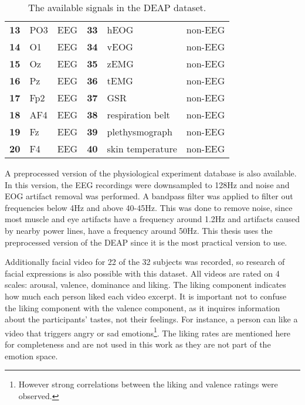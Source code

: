 \begin{table}[H]
\begin{tabular}{l|ll|l|ll}
\textbf{13}      & PO3           & EEG               & \textbf{33}      & hEOG             & non-EEG           \\
\textbf{14}      & O1            & EEG               & \textbf{34}      & vEOG             & non-EEG           \\
\textbf{15}      & Oz            & EEG               & \textbf{35}      & zEMG             & non-EEG           \\
\textbf{16}      & Pz            & EEG               & \textbf{36}      & tEMG             & non-EEG           \\
\textbf{17}      & Fp2           & EEG               & \textbf{37}      & GSR              & non-EEG           \\
\textbf{18}      & AF4           & EEG               & \textbf{38}      & respiration belt & non-EEG           \\
\textbf{19}      & Fz            & EEG               & \textbf{39}      & plethysmograph   & non-EEG           \\
\textbf{20}      & F4            & EEG               & \textbf{40}      & skin temperature & non-EEG          
\end{tabular}
\caption{The available signals in the DEAP dataset\label{DEAPSignals}.}
\end{table}

\npar

A preprocessed version of the physiological experiment database is also available. In this version, the EEG recordings were downsampled to 128Hz and noise and EOG artifact removal was performed. A bandpass filter was applied to filter out frequencies below 4Hz and above 40-45Hz. This was done to remove noise, since most muscle and eye artifacts have a frequency around 1.2Hz and artifacts caused by nearby power lines, have a frequency around 50Hz\cite{ExtendedPaper}. This thesis uses the preprocessed version of the DEAP since it is the most practical version to use.

\npar

Additionally facial video for 22 of the 32 subjects was recorded, so research of facial expressions is also possible with this dataset. All videos are rated on 4 scales: arousal, valence, dominance and liking. The liking component indicates how much each person liked each video excerpt. It is important not to confuse the liking component with the valence component, as it inquires information about the participants' tastes, not their feelings. For instance, a person can like a video that triggers angry or sad emotions\footnote{However strong correlations between the liking and valence ratings were observed\citep{DEAP}.}. The liking rates are mentioned here for completeness and are not used in this work as they are not part of the emotion space.

